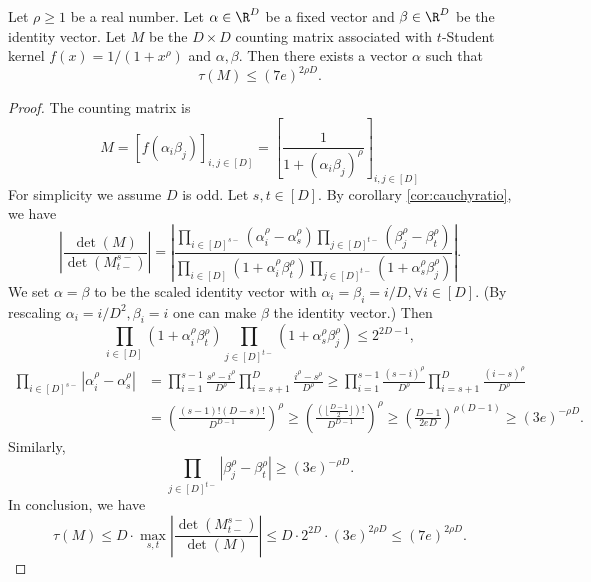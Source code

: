 \begin{theorem}
Let $\rho \ge 1$ be a real number. Let $\alpha \in \R^D$ be a fixed vector and $\beta \in \R^D$ be the identity vector.
Let $M$ be the $D \times D$ counting matrix associated with $t$-Student kernel $f(x) = 1/(1+x^{\rho})$ and $\alpha, \beta$. Then there exists a vector $\alpha$ such that
\[\tau(M) \le (7e)^{2\rho D} .\]
\end{theorem}
\begin{proof}
The counting matrix is
\[M = [f(\alpha_i\beta_j)]_{i, j \in [D]} = 
\left[\frac{1}{1 + (\alpha_i\beta_j)^{\rho}}\right]_{i, j \in [D]}\]
For simplicity we assume $D$ is odd. Let $s, t \in [D]$. By corollary \ref{cor:cauchyratio}, we have
\[\left|\frac{\det(M)}{\det(M^{s-}_{t-})}\right|
=\left|\frac{\prod_{i\in [D]^{s-}}(\alpha_i^\rho - \alpha_s^\rho)
\prod_{j\in [D]^{t-}}(\beta_j^\rho - \beta_t^\rho)}
{\prod_{i \in [D]}(1 + \alpha_i^\rho\beta_t^\rho)
\prod_{j \in [D]^{t-}}(1 + \alpha_s^\rho \beta_j^\rho)}\right|.\]
We set $\alpha = \beta$ to be the scaled identity vector with $\alpha_i = \beta_i = i/D, \forall i \in [D]$.
(By rescaling $\alpha_i = i/D^2, \beta_i = i$ one can make $\beta$ the identity vector.)
Then
\[\prod_{i \in [D]}(1 + \alpha_i^\rho\beta_t^\rho)
\prod_{j \in [D]^{t-}}(1 + \alpha_s^\rho \beta_j^\rho) \le 2^{2D-1},\]
\begin{align*}\prod_{i\in [D]^{s-}}|\alpha_i^\rho - \alpha_s^\rho|
&=\prod_{i = 1}^{s-1}\frac{s^\rho - i^\rho}{D^{\rho}}
\prod_{i = s+1}^{D}\frac{i^\rho - s^\rho}{D^{\rho}}
\ge \prod_{i = 1}^{s-1}\frac{(s-i)^\rho}{D^{\rho}}
\prod_{i = s+1}^{D}\frac{(i-s)^\rho}{D^{\rho}} \\
&=\left(\frac{(s-1)!(D-s)!}{D^{D-1}}\right)^\rho
\ge \left(\frac{(\lfloor\frac{D-1}2\rfloor)!}{D^{D-1}}\right)^{\rho}
\ge \left(\frac{D-1}{2eD}\right)^{\rho(D-1)} \ge (3e)^{-\rho D}.
\end{align*}
Similarly,
\[\prod_{j\in [D]^{t-}}|\beta_j^\rho - \beta_t^\rho| \ge (3e)^{-\rho D}.\]
In conclusion, we have
\[\tau(M) \le D \cdot \max_{s, t}\left|\frac{\det(M^{s-}_{t-})}{\det(M)}\right|
\le D \cdot 2^{2D} \cdot (3e)^{2\rho D} \le (7e)^{2\rho D}.\]
\end{proof}

